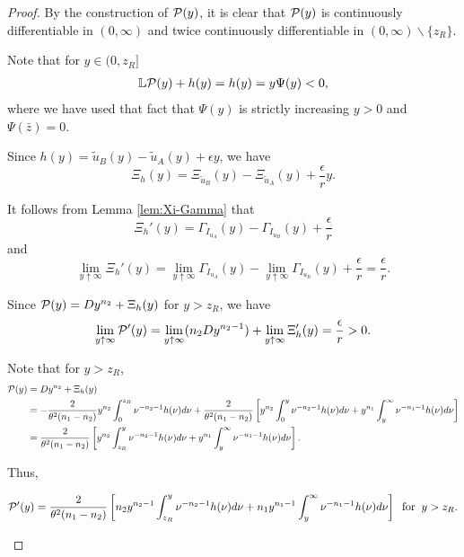 \documentclass[a4paper,report, 11pt]{article}
\def\e{\epsilon}
\def\t{\theta}
\begin{document}
\begin{proof}
	 By the construction of ${\cal P}(y)$, it is clear that ${\cal P}(y)$ is continuously differentiable in $(0,\infty)$ and twice continuously differentiable in $(0,\infty)\backslash\{z_R\}$.
	
	Note that for $y\in(0,z_R]$ 
	\begin{align*}
	\mathbb{L}{\cal P}(y)+h(y) = h(y) =y\Psi(y) < 0,
	\end{align*}
	where we have used that fact that $\Psi(y)$ is strictly increasing $y>0$ and $\Psi(\bar{z})=0$.
	
	Since $h(y)=\tilde{u}_B(y)-\tilde{u}_A(y)+\e y$, we have
	\begin{equation*}
	\Xi_h (y) = \Xi_{\tilde{u}_B}(y)-\Xi_{\tilde{u}_A}(y)+\dfrac{\e}{r}y. 
	\end{equation*}
	
	It follows from Lemma \ref{lem:Xi-Gamma} that 
	\begin{equation*}
	\Xi_h'(y) = \Gamma_{I_{u_A}}(y)-\Gamma_{I_{u_B}}(y) +\dfrac{\e}{r}
	\end{equation*}
	and 
	\begin{equation*}
	\lim_{y\uparrow \infty}\Xi_h'(y)=\lim_{y\uparrow \infty} \Gamma_{I_{u_A}}(y)- \lim_{y\uparrow \infty}\Gamma_{I_{u_B}}(y)+\dfrac{\e}{r}=\dfrac{\e}{r}.
	\end{equation*}
	
	Since ${\cal P}(y)=Dy^{n_2} + \Xi_h(y)$ for $y>z_R$, we have 
		\begin{align*}
		\lim_{y\uparrow \infty}{\cal P}'(y)=\lim_{y\uparrow \infty}(n_2Dy^{n_2-1}) + \lim_{y\uparrow \infty}\Xi_h'(y)=\dfrac{\e}{r}>0.
		\end{align*}
	
	Note that for $y>z_R$, 
		\begin{align*}
		{\cal P}(y)&=Dy^{n_2} + \Xi_h(y)\nonumber\\
		&=-\dfrac{2}{\t^2(n_1-n_2)}y^{n_2}\int_0^{z_R}\nu^{-n_2-1}{h}(\nu)d\nu+\dfrac{2}{\t^2(n_1-n_2)}\left[y^{n_2}\int_0^{y}\nu^{-n_2-1}{h}(\nu)d\nu +y^{n_1}\int_y^\infty \nu^{-n_1-1}{h}(\nu)d\nu\right]\\
		&=\dfrac{2}{\t^2(n_1-n_2)}\left[y^{n_2}\int_{z_R}^{y}\nu^{-n_2-1}{h}(\nu)d\nu +y^{n_1}\int_y^\infty \nu^{-n_1-1}{h}(\nu)d\nu\right].\nonumber
		\end{align*}



   Thus, 
   \begin{footnotesize}
   	 \begin{equation*}
   	{\cal P}'(y)=\dfrac{2}{\t^2(n_1-n_2)}\left[n_2y^{n_2-1}\int_{z_R}^{y}\nu^{-n_2-1}{h}(\nu)d\nu +n_1y^{n_1-1}\int_y^\infty \nu^{-n_1-1}{h}(\nu)d\nu\right]\;\;\mbox{for}\;\;y>z_R.
   	\end{equation*}
   \end{footnotesize}


\end{proof}
\end{document}
